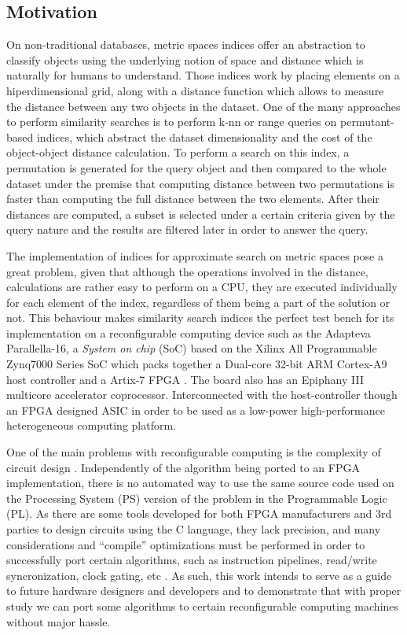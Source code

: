 \subsection{Motivation}
On non-traditional databases, metric spaces indices offer an abstraction to classify objects using
the underlying notion of space and distance which is naturally for humans to understand. Those indices 
work by placing elements on a hiperdimensional grid, along with a distance function which
allows to measure the distance between any two objects in the dataset.
One of the many approaches to perform similarity searches is to perform k-nn or range queries 
on permutant-based indices, which abstract the dataset dimensionality and the cost of the 
object-object distance calculation. To perform a search on this index, a permutation is generated
for the query object and then compared to the whole dataset under the premise that computing
distance between two permutations is faster than computing the full distance between the two
elements. After their distances are computed, a subset is selected under a certain 
criteria given by the query nature and the results are filtered later in order to answer the query.
\cite{5271946,5271944}

The implementation of indices for approximate search on metric spaces pose a great problem, given that although
the operations involved in the distance, calculations are rather easy to perform on a CPU, they
are executed individually for each element of the index, regardless of them being a part of the
solution or not. This behaviour makes similarity search indices the perfect test bench for its 
implementation on a reconfigurable computing device\cite{5999889} such as the Adapteva Parallella-16,
a \emph{System on chip} (SoC) based on the Xilinx All Programmable Zynq7000 Series SoC which packs together
a Dual-core 32-bit ARM Cortex-A9 host controller and a Artix-7 FPGA \cite{DBLP:journals/corr/OlofssonNZ14,LINLEY_1}.
The board also has an Epiphany III multicore accelerator coprocessor. Interconnected with the host-controller
though an FPGA designed ASIC in order to be used as a low-power high-performance heterogeneous computing 
platform.

One of the main problems with reconfigurable computing is the complexity of circuit design \cite{SPA_thesis}. 
Independently of the algorithm being ported to an FPGA implementation, there is no automated way to use
the same source code used on the Processing System (PS) version of the problem in the Programmable Logic (PL). 
As there are some tools developed for both FPGA manufacturers and 3rd parties to design circuits using the C 
language, they lack precision, and many considerations and ``compile'' optimizations must be performed 
in order to successfully port certain algorithms\cite{SPA_thesis}, such as instruction pipelines, read/write 
syncronization, clock gating\cite{XILINX_clockgating}, etc \cite{XILINX_axi,XILINX_clockgating,
XILINX_ddr_rate,XILINX_mem_interface}. As such, this work intends to serve as a guide to future hardware
designers and developers and to demonstrate that with proper study we can port some algorithms to
certain reconfigurable computing machines without major hassle.

